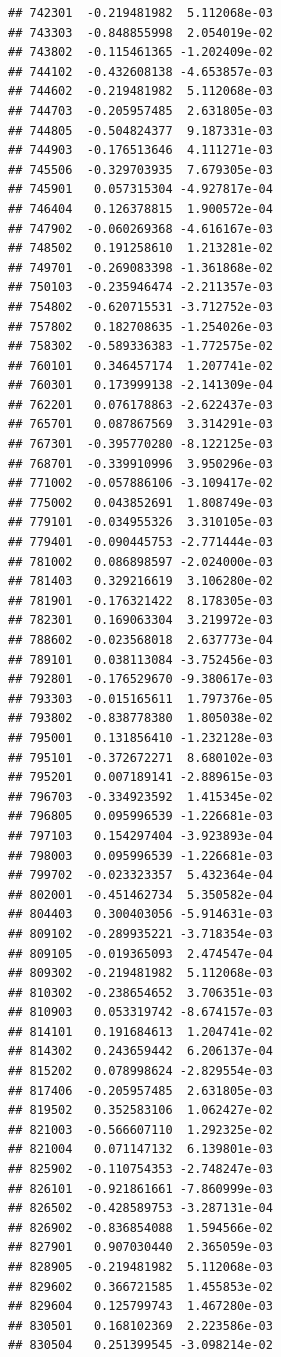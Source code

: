 \begin{frame}[fragile]
\begin{verbatim}
## 742301  -0.219481982  5.112068e-03
## 743303  -0.848855998  2.054019e-02
## 743802  -0.115461365 -1.202409e-02
## 744102  -0.432608138 -4.653857e-03
## 744602  -0.219481982  5.112068e-03
## 744703  -0.205957485  2.631805e-03
## 744805  -0.504824377  9.187331e-03
## 744903  -0.176513646  4.111271e-03
## 745506  -0.329703935  7.679305e-03
## 745901   0.057315304 -4.927817e-04
## 746404   0.126378815  1.900572e-04
## 747902  -0.060269368 -4.616167e-03
## 748502   0.191258610  1.213281e-02
## 749701  -0.269083398 -1.361868e-02
## 750103  -0.235946474 -2.211357e-03
## 754802  -0.620715531 -3.712752e-03
## 757802   0.182708635 -1.254026e-03
## 758302  -0.589336383 -1.772575e-02
## 760101   0.346457174  1.207741e-02
## 760301   0.173999138 -2.141309e-04
## 762201   0.076178863 -2.622437e-03
## 765701   0.087867569  3.314291e-03
## 767301  -0.395770280 -8.122125e-03
## 768701  -0.339910996  3.950296e-03
## 771002  -0.057886106 -3.109417e-02
## 775002   0.043852691  1.808749e-03
## 779101  -0.034955326  3.310105e-03
## 779401  -0.090445753 -2.771444e-03
## 781002   0.086898597 -2.024000e-03
## 781403   0.329216619  3.106280e-02
## 781901  -0.176321422  8.178305e-03
## 782301   0.169063304  3.219972e-03
## 788602  -0.023568018  2.637773e-04
## 789101   0.038113084 -3.752456e-03
## 792801  -0.176529670 -9.380617e-03
## 793303  -0.015165611  1.797376e-05
## 793802  -0.838778380  1.805038e-02
## 795001   0.131856410 -1.232128e-03
## 795101  -0.372672271  8.680102e-03
## 795201   0.007189141 -2.889615e-03
## 796703  -0.334923592  1.415345e-02
## 796805   0.095996539 -1.226681e-03
## 797103   0.154297404 -3.923893e-04
## 798003   0.095996539 -1.226681e-03
## 799702  -0.023323357  5.432364e-04
## 802001  -0.451462734  5.350582e-04
## 804403   0.300403056 -5.914631e-03
## 809102  -0.289935221 -3.718354e-03
## 809105  -0.019365093  2.474547e-04
## 809302  -0.219481982  5.112068e-03
## 810302  -0.238654652  3.706351e-03
## 810903   0.053319742 -8.674157e-03
## 814101   0.191684613  1.204741e-02
## 814302   0.243659442  6.206137e-04
## 815202   0.078998624 -2.829554e-03
## 817406  -0.205957485  2.631805e-03
## 819502   0.352583106  1.062427e-02
## 821003  -0.566607110  1.292325e-02
## 821004   0.071147132  6.139801e-03
## 825902  -0.110754353 -2.748247e-03
## 826101  -0.921861661 -7.860999e-03
## 826502  -0.428589753 -3.287131e-04
## 826902  -0.836854088  1.594566e-02
## 827901   0.907030440  2.365059e-03
## 828905  -0.219481982  5.112068e-03
## 829602   0.366721585  1.455853e-02
## 829604   0.125799743  1.467280e-03
## 830501   0.168102369  2.223586e-03
## 830504   0.251399545 -3.098214e-02

\end{verbatim}
\end{frame}
